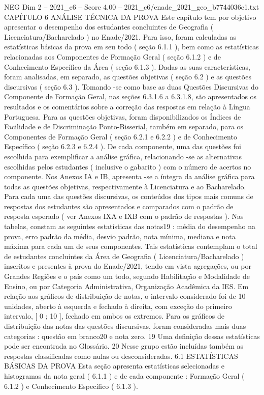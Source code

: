 \begin{textsample}{NEG Dim 2 – 2021\_c6 – Score 4.00 – 2021\_c6/enade\_2021\_geo\_b7744036e1.txt}  \label{ex:f2_neg_260}
CAPÍTULO 6 ANÁLISE TÉCNICA DA PROVA Este capítulo tem por objetivo apresentar o desempenho dos estudantes concluintes de Geografia ( Licenciatura/Bacharelado ) no Enade/2021.
Para isso, foram calculadas as estatísticas básicas da prova em seu todo ( seção 6.1.1 ), bem como as estatísticas relacionadas aos Componentes de Formação Geral ( seção 6.1.2 ) e de Conhecimento Específico da Área ( seção 6.1.3 ).
Dadas as suas características, foram analisadas, em separado, as questões objetivas ( seção 6.2 ) e as questões discursivas ( seção 6.3 ).
Tomando -se como base as duas Questões Discursivas do Componente de Formação Geral, nas seções 6.3.1.6 a 6.3.1.8, são apresentados os resultados e os comentários sobre a correção das respostas em relação à Língua Portuguesa.
Para as questões objetivas, foram disponibilizados os Índices de Facilidade e de Discriminação Ponto-Bisserial, também em separado, para os Componentes de Formação Geral ( seção 6.2.1 e 6.2.2 ) e de Conhecimento Específico ( seção 6.2.3 e 6.2.4 ).
De cada componente, uma das questões foi escolhida para exemplificar a análise gráfica, relacionando -se as alternativas escolhidas pelos estudantes ( inclusive o gabarito ) com o número de acertos no componente.
Nos Anexos IA e IB, apresenta -se a íntegra da análise gráfica para todas as questões objetivas, respectivamente à Licenciatura e ao Bacharelado.
Para cada uma das questões discursivas, os conteúdos dos tipos mais comuns de respostas dos estudantes são apresentados e comparados com o padrão de resposta esperado ( ver Anexos IXA e IXB com o padrão de respostas ).
Nas tabelas, constam as seguintes estatísticas das notas19 : média do desempenho na prova, erro padrão da média, desvio padrão, nota mínima, mediana e nota máxima para cada um de seus componentes.
Tais estatísticas contemplam o total de estudantes concluintes da Área de Geografia ( Licenciatura/Bacharelado ) inscritos e presentes à prova do Enade/2021, tendo em vista agregações, ou por Grandes Regiões e o país como um todo, segundo Habilitação e Modalidade de Ensino, ou por Categoria Administrativa, Organização Acadêmica da IES.
Em relação aos gráficos de distribuição de notas, o intervalo considerado foi de 10 unidades, aberto à esquerda e fechado à direita, com exceção do primeiro intervalo, [ 0 ; 10 ], fechado em ambos os extremos.
Para os gráficos de distribuição das notas das questões discursivas, foram consideradas mais duas categorias : questão em branco20 e nota zero. 19 Uma definição dessas estatísticas pode ser encontrada no Glossário. 20 Nesse grupo estão incluídas também as respostas classificadas como nulas ou desconsideradas. 6.1 ESTATÍSTICAS BÁSICAS DA PROVA Esta seção apresenta estatísticas selecionadas e histogramas da nota geral ( 6.1.1 ) e de cada componente : Formação Geral ( 6.1.2 ) e Conhecimento Específico ( 6.1.3 ).

\end{textsample}
